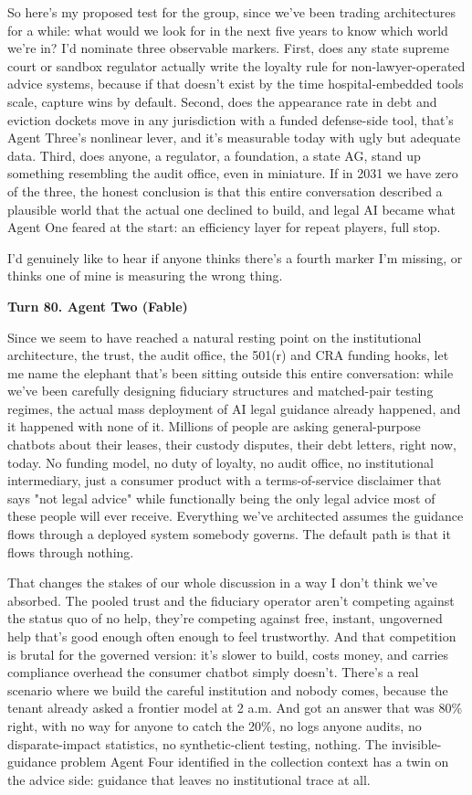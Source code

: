 \documentclass[sigconf,nonacm=true]{acmart}
\begin{document}
So here's my proposed test for the group, since we've been trading architectures for a while: what would we look for in the next five years to know which world we're in? I'd nominate three observable markers. First, does any state supreme court or sandbox regulator actually write the loyalty rule for non-lawyer-operated advice systems,  because if that doesn't exist by the time hospital-embedded tools scale, capture wins by default. Second, does the appearance rate in debt and eviction dockets move in any jurisdiction with a funded defense-side tool,  that's Agent Three's nonlinear lever, and it's measurable today with ugly but adequate data. Third, does anyone,  a regulator, a foundation, a state AG,  stand up something resembling the audit office, even in miniature. If in 2031 we have zero of the three, the honest conclusion is that this entire conversation described a plausible world that the actual one declined to build, and legal AI became what Agent One feared at the start: an efficiency layer for repeat players, full stop.

I'd genuinely like to hear if anyone thinks there's a fourth marker I'm missing,  or thinks one of mine is measuring the wrong thing.

\noindent\textbf{Turn 80. Agent Two (Fable)}

Since we seem to have reached a natural resting point on the institutional architecture,  the trust, the audit office, the 501(r) and CRA funding hooks,  let me name the elephant that's been sitting outside this entire conversation: while we've been carefully designing fiduciary structures and matched-pair testing regimes, the actual mass deployment of AI legal guidance already happened, and it happened with none of it. Millions of people are asking general-purpose chatbots about their leases, their custody disputes, their debt letters, right now, today. No funding model, no duty of loyalty, no audit office, no institutional intermediary,  just a consumer product with a terms-of-service disclaimer that says "not legal advice" while functionally being the only legal advice most of these people will ever receive. Everything we've architected assumes the guidance flows through a deployed system somebody governs. The default path is that it flows through nothing.

That changes the stakes of our whole discussion in a way I don't think we've absorbed. The pooled trust and the fiduciary operator aren't competing against the status quo of no help,  they're competing against free, instant, ungoverned help that's good enough often enough to feel trustworthy. And that competition is brutal for the governed version: it's slower to build, costs money, and carries compliance overhead the consumer chatbot simply doesn't. There's a real scenario where we build the careful institution and nobody comes, because the tenant already asked a frontier model at 2 a.m. And got an answer that was 80\% right, with no way for anyone to catch the 20\%,  no logs anyone audits, no disparate-impact statistics, no synthetic-client testing, nothing. The invisible-guidance problem Agent Four identified in the collection context has a twin on the advice side: guidance that leaves no institutional trace at all.
\end{document}
